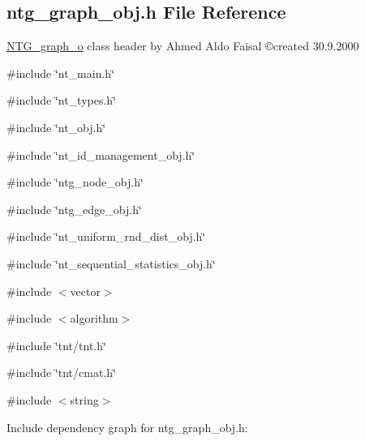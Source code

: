 \subsection{ntg\_\-graph\_\-obj.h File Reference}
\label{ntg__graph__obj_8h}



\begin{DoxyItemize}
\item \hyperlink{class_n_t_g__graph__o}{NTG\_\-graph\_\-o} class header by Ahmed Aldo Faisal \copyright created 30.9.2000 
\end{DoxyItemize} 


{\ttfamily \#include \char`\"{}nt\_\-main.h\char`\"{}}\par
{\ttfamily \#include \char`\"{}nt\_\-types.h\char`\"{}}\par
{\ttfamily \#include \char`\"{}nt\_\-obj.h\char`\"{}}\par
{\ttfamily \#include \char`\"{}nt\_\-id\_\-management\_\-obj.h\char`\"{}}\par
{\ttfamily \#include \char`\"{}ntg\_\-node\_\-obj.h\char`\"{}}\par
{\ttfamily \#include \char`\"{}ntg\_\-edge\_\-obj.h\char`\"{}}\par
{\ttfamily \#include \char`\"{}nt\_\-uniform\_\-rnd\_\-dist\_\-obj.h\char`\"{}}\par
{\ttfamily \#include \char`\"{}nt\_\-sequential\_\-statistics\_\-obj.h\char`\"{}}\par
{\ttfamily \#include $<$vector$>$}\par
{\ttfamily \#include $<$algorithm$>$}\par
{\ttfamily \#include \char`\"{}tnt/tnt.h\char`\"{}}\par
{\ttfamily \#include \char`\"{}tnt/cmat.h\char`\"{}}\par
{\ttfamily \#include $<$string$>$}\par
Include dependency graph for ntg\_\-graph\_\-obj.h:
\nopagebreak
